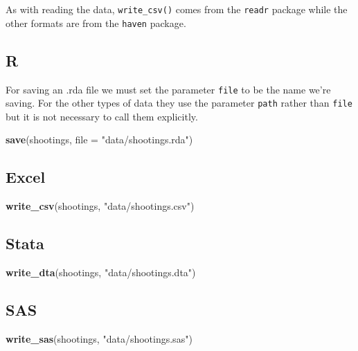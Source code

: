 \documentclass[
  12pt,
]{book}
\newenvironment{Shaded}{\begin{snugshade}}{\end{snugshade}}
\newcommand{\DataTypeTok}[1]{\textcolor[rgb]{0.27,0.27,0.27}{#1}}
\newcommand{\KeywordTok}[1]{\textcolor[rgb]{0.27,0.27,0.27}{\textbf{#1}}}
\newcommand{\NormalTok}[1]{#1}
\newcommand{\StringTok}[1]{\textcolor[rgb]{0.5,0.5,0.5}{#1}}
\begin{document}
As with reading the data, \texttt{write\_csv()} comes from the \texttt{readr} package while the other formats are from the \texttt{haven} package.

\hypertarget{r-1}{%
\subsection{R}\label{r-1}}

For saving an .rda file we must set the parameter \texttt{file} to be the name we're saving. For the other types of data they use the parameter \texttt{path} rather than \texttt{file} but it is not necessary to call them explicitly.

\begin{Shaded}
\begin{Highlighting}[]
\KeywordTok{save}\NormalTok{(shootings, }\DataTypeTok{file =}  \StringTok{"data/shootings.rda"}\NormalTok{)}
\end{Highlighting}
\end{Shaded}

\hypertarget{excel-1}{%
\subsection{Excel}\label{excel-1}}

\begin{Shaded}
\begin{Highlighting}[]
\KeywordTok{write\_csv}\NormalTok{(shootings, }\StringTok{"data/shootings.csv"}\NormalTok{)}
\end{Highlighting}
\end{Shaded}

\hypertarget{stata-1}{%
\subsection{Stata}\label{stata-1}}

\begin{Shaded}
\begin{Highlighting}[]
\KeywordTok{write\_dta}\NormalTok{(shootings, }\StringTok{"data/shootings.dta"}\NormalTok{)}
\end{Highlighting}
\end{Shaded}

\hypertarget{sas-1}{%
\subsection{SAS}\label{sas-1}}

\begin{Shaded}
\begin{Highlighting}[]
\KeywordTok{write\_sas}\NormalTok{(shootings, }\StringTok{"data/shootings.sas"}\NormalTok{)}
\end{Highlighting}
\end{Shaded}
\end{document}

